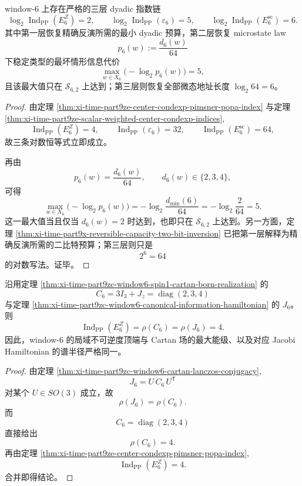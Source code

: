 \begin{corollary}\label{cor:xi-time-part9ze-window6-bit-ladder}
window-\(6\) 上存在严格的三层 dyadic 指数链
\[
\log_2\operatorname{Ind}_{\mathrm{PP}}(E_6^Z)=2,
\qquad
\log_2\operatorname{Ind}_{\mathrm{PP}}(\varepsilon_6)=5,
\qquad
\log_2\operatorname{Ind}_{\mathrm{PP}}(E_6^{\mathrm{sc}})=6.
\]
其中第一层恢复精确反演所需的最小 dyadic 预算，第二层恢复 microstate law
\[
p_6(w):=\frac{d_6(w)}{64}
\]
下稳定类型的最坏情形信息代价
\[
\max_{w\in X_6}\bigl(-\log_2 p_6(w)\bigr)=5,
\]
且该最大值只在 \(\mathcal S_{6,2}\) 上达到；第三层则恢复全部微态地址长度 \(\log_2 64=6\)。
\end{corollary}
\begin{proof}
由定理 \ref{thm:xi-time-part9ze-center-condexp-pimsner-popa-index} 与定理
\ref{thm:xi-time-part9ze-scalar-weighted-center-condexp-indices},
\[
\operatorname{Ind}_{\mathrm{PP}}(E_6^Z)=4,
\qquad
\operatorname{Ind}_{\mathrm{PP}}(\varepsilon_6)=32,
\qquad
\operatorname{Ind}_{\mathrm{PP}}(E_6^{\mathrm{sc}})=64,
\]
故三条对数恒等式立即成立。

再由
\[
p_6(w)=\frac{d_6(w)}{64},
\qquad
d_6(w)\in\{2,3,4\},
\]
可得
\[
\max_{w\in X_6}\bigl(-\log_2 p_6(w)\bigr)
=
-\log_2\frac{d_{\min}(6)}{64}
=
-\log_2\frac{2}{64}
=
5.
\]
这一最大值当且仅当 \(d_6(w)=2\) 时达到，也即只在 \(\mathcal S_{6,2}\) 上达到。另一方面，定理
\ref{thm:xi-time-part9x-reversible-capacity-two-bit-inversion} 已把第一层解释为精确反演所需的二比特预算；第三层则只是
\[
2^6=64
\]
的对数写法。证毕。
\end{proof}

\begin{theorem}\label{thm:xi-time-part9ze-index-spectral-radius-consistency}
沿用定理 \ref{thm:xi-time-part9zc-window6-spin1-cartan-born-realization} 的
\[
C_6=3I_3+J_z=\operatorname{diag}(2,3,4)
\]
与定理 \ref{thm:xi-time-part9zc-window6-canonical-information-hamiltonian} 的 \(J_6\)。则
\[
\operatorname{Ind}_{\mathrm{PP}}(E_6^Z)=\rho(C_6)=\rho(J_6)=4.
\]
因此，window-\(6\) 的局域不可逆度顶端与 Cartan 场的最大能级、以及对应 Jacobi Hamiltonian 的谱半径严格同一。
\end{theorem}
\begin{proof}
由定理 \ref{thm:xi-time-part9zc-window6-cartan-lanczos-conjugacy},
\[
J_6=U\,C_6\,U^{\mathsf T}
\]
对某个 \(U\in SO(3)\) 成立，故
\[
\rho(J_6)=\rho(C_6).
\]
而
\[
C_6=\operatorname{diag}(2,3,4)
\]
直接给出
\[
\rho(C_6)=4.
\]
再由定理 \ref{thm:xi-time-part9ze-center-condexp-pimsner-popa-index},
\[
\operatorname{Ind}_{\mathrm{PP}}(E_6^Z)=4.
\]
合并即得结论。
\end{proof}

